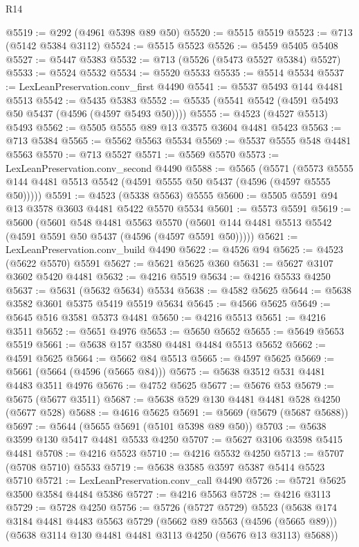 \begin{lexlean}{R14}
\begin{coremodule}
@5519 := @292 (@4961 @5398 @89 @50)
@5520 := @5515 @5519
@5523 := @713 (@5142 @5384 @3112)
@5524 := @5515 @5523
@5526 := @5459 @5405 @5408
@5527 := @5447 @5383
@5532 := @713 (@5526 (@5473 @5527 @5384) @5527)
@5533 := @5524 @5532
@5534 := @5520 @5533
@5535 := @5514 @5534
@5537 := LexLeanPreservation.conv_first @4490
@5541 := @5537 @5493 @144 @4481 @5513
@5542 := @5435 @5383
@5552 := @5535 (@5541 @5542 (@4591 @5493 @50 @5437 (@4596 (@4597 @5493 @50))))
@5555 := @4523 (@4527 @5513) @5493
@5562 := @5505 @5555 @89 @13 @3575 @3604 @4481 @5423
@5563 := @713 @5384
@5565 := @5562 @5563 @5534
@5569 := @5537 @5555 @548 @4481 @5563
@5570 := @713 @5527
@5571 := @5569 @5570
@5573 := LexLeanPreservation.conv_second @4490
@5588 := @5565
    (@5571 (@5573 @5555 @144 @4481 @5513 @5542 (@4591 @5555 @50 @5437 (@4596 (@4597 @5555 @50)))))
@5591 := @4523 (@5338 @5563) @5555
@5600 := @5505 @5591 @94 @13 @3578 @3603 @4481 @5422 @5570 @5534
@5601 := @5573 @5591
@5619 := @5600
    (@5601
      @548
      @4481
      @5563
      @5570
      (@5601 @144 @4481 @5513 @5542 (@4591 @5591 @50 @5437 (@4596 (@4597 @5591 @50)))))
@5621 := LexLeanPreservation.conv_build @4490
@5622 := @4526 @94
@5625 := @4523 (@5622 @5570) @5591
@5627 := @5621 @5625 @360
@5631 := @5627 @3107 @3602 @5420 @4481
@5632 := @4216 @5519
@5634 := @4216 @5533 @4250
@5637 := @5631 (@5632 @5634) @5534
@5638 := @4582 @5625
@5644 := @5638 @3582 @3601 @5375 @5419 @5519 @5634
@5645 := @4566 @5625
@5649 := @5645 @516 @3581 @5373 @4481
@5650 := @4216 @5513
@5651 := @4216 @3511
@5652 := @5651 @4976
@5653 := @5650 @5652
@5655 := @5649 @5653 @5519
@5661 := @5638 @157 @3580 @4481 @4484 @5513 @5652
@5662 := @4591 @5625
@5664 := @5662 @84 @5513
@5665 := @4597 @5625
@5669 := @5661 (@5664 (@4596 (@5665 @84)))
@5675 := @5638 @3512 @531 @4481 @4483 @3511 @4976
@5676 := @4752 @5625
@5677 := @5676 @53
@5679 := @5675 (@5677 @3511)
@5687 := @5638 @529 @130 @4481 @4481 @528 @4250 (@5677 @528)
@5688 := @4616 @5625
@5691 := @5669 (@5679 (@5687 @5688))
@5697 := @5644 (@5655 @5691 (@5101 @5398 @89 @50))
@5703 := @5638 @3599 @130 @5417 @4481 @5533 @4250
@5707 := @5627 @3106 @3598 @5415 @4481
@5708 := @4216 @5523
@5710 := @4216 @5532 @4250
@5713 := @5707 (@5708 @5710) @5533
@5719 := @5638 @3585 @3597 @5387 @5414 @5523 @5710
@5721 := LexLeanPreservation.conv_call @4490
@5726 := @5721 @5625 @3500 @3584 @4484 @5386
@5727 := @4216 @5563
@5728 := @4216 @3113
@5729 := @5728 @4250
@5756 := @5726
    (@5727 @5729)
    @5523
    (@5638
      @174
      @3184
      @4481
      @4483
      @5563
      @5729
      (@5662 @89 @5563 (@4596 (@5665 @89)))
      (@5638 @3114 @130 @4481 @4481 @3113 @4250 (@5676 @13 @3113) @5688))

\end{coremodule}
\end{lexlean}
